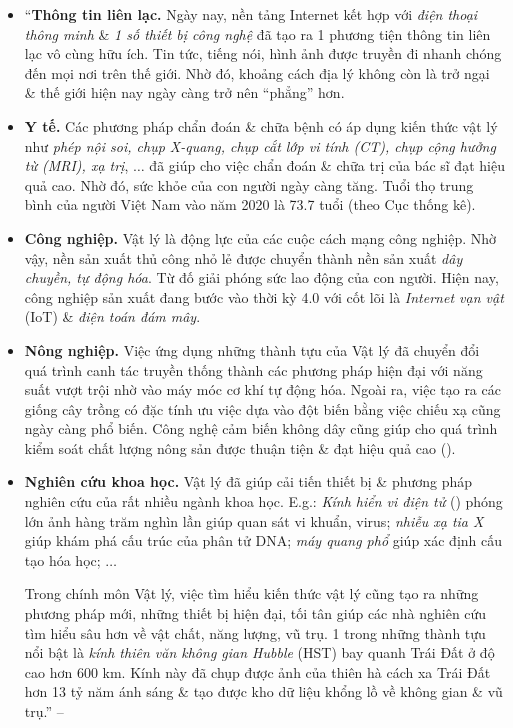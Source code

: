 \documentclass{article}
\numberwithin{equation}{section}
\begin{document}
\begin{itemize}
	\item ``\textbf{Thông tin liên lạc.} Ngày nay, nền tảng Internet kết hợp với \textit{điện thoại thông minh} \& \textit{1 số thiết bị công nghệ} đã tạo ra 1 phương tiện thông tin liên lạc vô cùng hữu ích. Tin tức, tiếng nói, hình ảnh được truyền đi nhanh chóng đến mọi nơi trên thế giới. Nhờ đó, khoảng cách địa lý không còn là trở ngại \& thế giới hiện nay ngày càng trở nên ``phẳng'' hơn.
	\item \textbf{Y tế.} Các phương pháp chẩn đoán \& chữa bệnh có áp dụng kiến thức vật lý như \textit{phép nội soi, chụp X-quang, chụp cắt lớp vi tính (CT), chụp cộng hưởng từ (MRI), xạ trị}, $\ldots$ đã giúp cho việc chẩn đoán \& chữa trị của bác sĩ đạt hiệu quả cao. Nhờ đó, sức khỏe của con người ngày càng tăng. Tuổi thọ trung bình của người Việt Nam vào năm 2020 là 73.7 tuổi (theo Cục thống kê).
	\item \textbf{Công nghiệp.} Vật lý là động lực của các cuộc cách mạng công nghiệp. Nhờ vậy, nền sản xuất thủ công nhỏ lẻ được chuyển thành nền sản xuất \textit{dây chuyền, tự động hóa}. Từ đố giải phóng sức lao động của con người. Hiện nay, công nghiệp sản xuất đang bước vào thời kỳ 4.0 với cốt lõi là \textit{Internet vạn vật} (IoT) \& \textit{điện toán đám mây}.
	\item \textbf{Nông nghiệp.} Việc ứng dụng những thành tựu của Vật lý đã chuyển đổi quá trình canh tác truyền thống thành các phương pháp hiện đại với năng suất vượt trội nhờ vào máy móc cơ khí tự động hóa. Ngoài ra, việc tạo ra các giống cây trồng có đặc tính ưu việc dựa vào đột biến bằng việc chiếu xạ cũng ngày càng phổ biến. Công nghệ cảm biến không dây cũng giúp cho quá trình kiểm soát chất lượng nông sản được thuận tiện \& đạt hiệu quả cao (\cite[Hình 1.6: \textsf{Công nghệ cảm biến trong việc kiểm soát chất lượng nông sản.}, p. 10]{SGK_Vat_Ly_10_Chan_Troi_Sang_Tao}).
	\item \textbf{Nghiên cứu khoa học.} Vật lý đã giúp cải tiến thiết bị \& phương pháp nghiên cứu của rất nhiều ngành khoa học. E.g.: \textit{Kính hiển vi điện tử} (\cite[Hình 1.7: \textsf{Kính hiển vi điện tử}, p. 10]{SGK_Vat_Ly_10_Chan_Troi_Sang_Tao}) phóng lớn ảnh hàng trăm nghìn lần giúp quan sát vi khuẩn, virus; \textit{nhiễu xạ tia X} giúp khám phá cấu trúc của phân tử DNA; \textit{máy quang phổ} giúp xác định cấu tạo hóa học; $\ldots$
	
	Trong chính môn Vật lý, việc tìm hiểu kiến thức vật lý cũng tạo ra những phương pháp mới, những thiết bị hiện đại, tối tân giúp các nhà nghiên cứu tìm hiểu sâu hơn về vật chất, năng lượng, vũ trụ. 1 trong những thành tựu nổi bật là \textit{kính thiên văn không gian Hubble} (HST) bay quanh Trái Đất ở độ cao hơn 600 km. Kính này đã chụp được ảnh của thiên hà cách xa Trái Đất hơn 13 tỷ năm ánh sáng \& tạo được kho dữ liệu khổng lồ về không gian \& vũ trụ.'' -- \cite[p. 10]{SGK_Vat_Ly_10_Chan_Troi_Sang_Tao}
\end{itemize}
\end{document}
